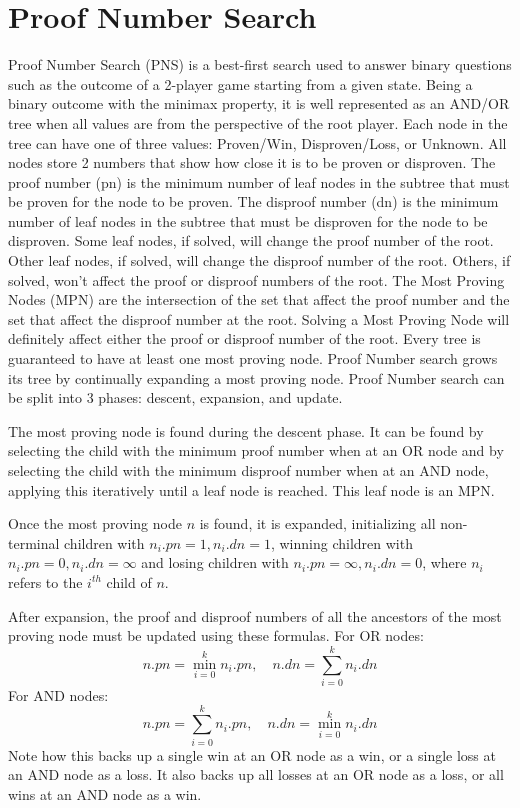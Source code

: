 \section{Proof Number Search} \label{sec:PNS}

Proof Number Search (PNS) is a best-first search used to answer binary questions such as the outcome of a 2-player game starting from a given state. Being a binary outcome with the minimax property, it is well represented as an AND/OR tree when all values are from the perspective of the root player. Each node in the tree can have one of three values: Proven/Win, Disproven/Loss, or Unknown. All nodes store 2 numbers that show how close it is to be proven or disproven. The proof number (pn) is the minimum number of leaf nodes in the subtree that must be proven for the node to be proven. The disproof number (dn) is the minimum number of leaf nodes in the subtree that must be disproven for the node to be disproven. Some leaf nodes, if solved, will change the proof number of the root. Other leaf nodes, if solved, will change the disproof number of the root. Others, if solved, won't affect the proof or disproof numbers of the root. The Most Proving Nodes (MPN) are the intersection of the set that affect the proof number and the set that affect the disproof number at the root. Solving a Most Proving Node will definitely affect either the proof or disproof number of the root. Every tree is guaranteed to have at least one most proving node. Proof Number search grows its tree by continually expanding a most proving node. Proof Number search can be split into 3 phases: descent, expansion, and update.

The most proving node is found during the descent phase. It can be found by selecting the child with the minimum proof number when at an OR node and by selecting the child with the minimum disproof number when at an AND node, applying this iteratively until a leaf node is reached. This leaf node is an MPN.

Once the most proving node $n$ is found, it is expanded, initializing all non-terminal children with $n_i.pn = 1, n_i.dn = 1$, winning children with $n_i.pn = 0, n_i.dn = \infty$ and losing children with $n_i.pn = \infty, n_i.dn = 0 $, where $n_i$ refers to the $i^{th}$ child of $n$.

After expansion, the proof and disproof numbers of all the ancestors of the most proving node must be updated using these formulas. For OR nodes: $$ n.pn = \displaystyle\min\limits_{i=0}^k n_i.pn,\quad n.dn = \displaystyle\sum\limits_{i=0}^k n_i.dn $$ For AND nodes: $$ n.pn = \displaystyle\sum\limits_{i=0}^k n_i.pn, \quad n.dn = \displaystyle\min\limits_{i=0}^k n_i.dn $$ Note how this backs up a single win at an OR node as a win, or a single loss at an AND node as a loss. It also backs up all losses at an OR node as a loss, or all wins at an AND node as a win. %

